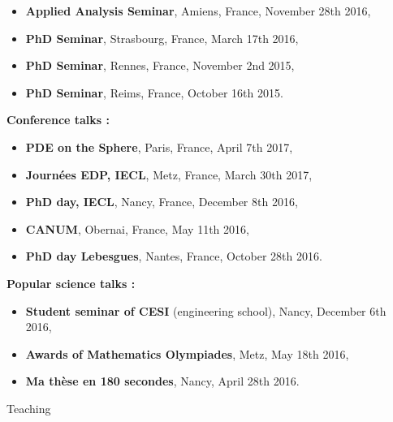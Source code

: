 \documentclass[10pt,a4paper]{report}
\begin{document}
\begin{itemize}
\item \textbf{Applied Analysis Seminar}, Amiens, France, November 28th 2016,
\item \textbf{PhD Seminar}, Strasbourg, France, March 17th 2016,
\item \textbf{PhD Seminar}, Rennes, France, November 2nd 2015,
\item \textbf{PhD Seminar}, Reims, France, October 16th 2015.
\end{itemize}

\vspace{0.4cm}
\noindent
{\selectfont
\textbf{Conference talks :}
}

\begin{itemize}
\item \textbf{PDE on the Sphere}, Paris, France, April 7th 2017,
\item \textbf{Journées EDP, IECL}, Metz, France, March 30th 2017,
\item \textbf{PhD day, IECL}, Nancy, France, December 8th 2016,
\item \textbf{CANUM}, Obernai, France, May 11th 2016,
\item \textbf{PhD day Lebesgues}, Nantes, France, October 28th 2016.
\end{itemize}

\vspace{0.4cm}
\noindent
{\selectfont
\textbf{Popular science talks :}
}
\begin{itemize}
\item \textbf{Student seminar of CESI }(engineering school), Nancy, December 6th 2016,
\item \textbf{Awards of Mathematics Olympiades}, Metz, May 18th 2016,
\item \textbf{Ma thèse en 180 secondes}, Nancy, April 28th 2016.
\end{itemize}

\vspace{1cm}
\noindent
{\selectfont
\begin{Large}
Teaching
\end{Large}
\hrulefill
}
\end{document}
